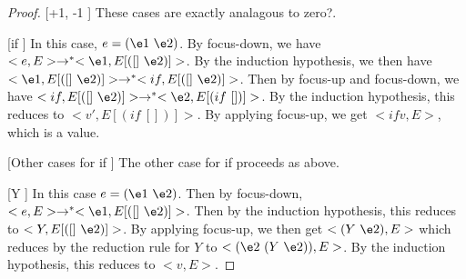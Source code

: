 \documentclass{article}[12pt]
\newcommand\red{\rightarrow^*}
\begin{document}
\begin{proof}
\item[[+1, -1]] These cases are exactly analagous to zero?.

\item[[if]] In this case, $e = (\e1\ \e2)$.  By focus-down, we have
  $<e,E> \rightarrow^* <\e1,E[([]\ \e2)]>$. By the induction
  hypothesis, we then have $<\e1,E[([]\ \e2)]> \red <if,E[([]\
  \e2)]>$. Then by focus-up and focus-down, we have $<if,E[([]\
  \e2)]> \red <\e2,E[(if\ [])]>$.  By the induction hypothesis, this
  reduces to $<v',E[(if\ [])]>$.  By applying focus-up, we get $<if
  v,E>$, which is a value.

\item[[Other cases for if]] The other case for if proceeds as above.

\item[[Y]] In this case $e = (\e1\ \e2)$.  Then by focus-down,
  $<e,E> \rightarrow^* <\e1,E[([]\ \e2)]>$.  Then by the induction
  hypothesis, this reduces to $<Y,E[([]\ \e2)]>$.  By applying
  focus-up, we then get $<(Y\ \e2),E>$ which reduces by the reduction
  rule for $Y$ to $<(\e2\ (Y\ \e2)),E>$.  By the induction hypothesis,
  this reduces to $<v,E>$.  

\end{proof}
\end{document}

